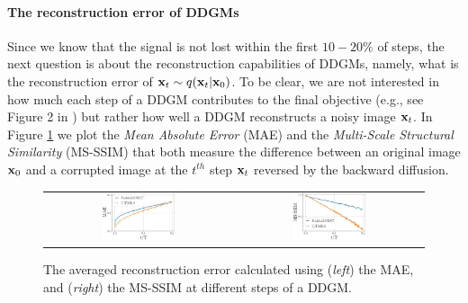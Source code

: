 \paragraph{The reconstruction error of DDGMs} Since we know that the signal is not lost within the first $10-20\%$ of steps, the next question is about the reconstruction capabilities of DDGMs, namely, what is the reconstruction error of ${\mathbf{x}}_t \sim q({\mathbf{x}}_t | {\mathbf{x}}_0)$. To be clear, we are not interested in how much each step of a DDGM contributes to the final objective (e.g., see Figure 2 in \cite{nichol2021improved}) but rather how well a DDGM reconstructs a noisy image ${\mathbf{x}}_t$.
In Figure \ref{fig:reconstruction_error_analysis} we plot the \textit{Mean Absolute Error} (MAE) and the \textit{Multi-Scale Structural Similarity} (MS-SSIM) \cite{wang2003multiscale} that both measure the difference between an original image ${\mathbf{x}}_0$ and a corrupted image at the $t^{th}$ step ${\mathbf{x}}_t$ reversed by the backward diffusion. 

     \begin{figure}[t]
    \begin{tabular}{cc}
        \includegraphics[width=0.4\textwidth]{pics/4_daed/experiments/MAE_step.pdf} &
        \includegraphics[width=0.4\textwidth]{pics/4_daed/experiments/MSSSIM_step.pdf} \\
    \end{tabular}
    \caption{The averaged reconstruction error calculated using (\textit{left}) the MAE, and (\textit{right}) the MS-SSIM at different steps of a DDGM.}
    \label{fig:reconstruction_error_analysis}
    \vspace*{\baselineskip}
     \end{figure}


